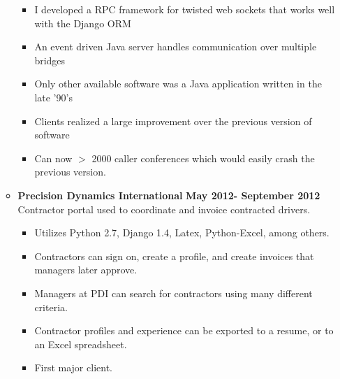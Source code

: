 \documentclass[overlapped]{res}
\begin{document}
\begin{resume}
\begin{itemize}[leftmargin=0in]
\begin{itemize}[leftmargin=0in]
\begin{samepage}
\begin{itemize}
                        \item[\textbullet] I developed a RPC framework for twisted web sockets that works well with the Django ORM
                        \item[\textbullet] An event driven Java server handles communication over multiple bridges
                        \item[\textbullet] Only other available software was a Java application written in the late '90's
                        \item[\textbullet] Clients realized a large improvement over the previous version of software
                        \item[\textbullet] Can now $>$ 2000 caller conferences which would easily crash the previous version.
                    \end{itemize}
                \end{samepage}
            \item[]
                \begin{samepage}
                    \textbf{Precision Dynamics International} \hfill \textbf{May 2012- September 2012} \\
                    Contractor portal used to coordinate and invoice contracted drivers.
                    \begin{itemize}
                        \item[\textbullet] Utilizes Python 2.7, Django 1.4, Latex, Python-Excel, among others.
                        \item[\textbullet] Contractors can sign on, create a profile, and create invoices that managers later approve.
                        \item[\textbullet] Managers at PDI can search for contractors using many different criteria.
                        \item[\textbullet] Contractor profiles and experience can be exported to a resume, or to an Excel spreadsheet.
                        \item[\textbullet] First major client.
                    \end{itemize}
                \end{samepage}
        \end{itemize}
\end{itemize}
\vspace{0.25in}


\end{resume}
\end{document}
